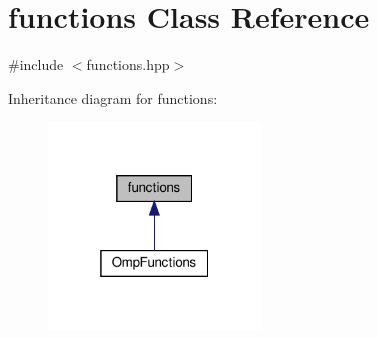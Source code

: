 \hypertarget{classfunctions}{}\section{functions Class Reference}
\label{classfunctions}


{\ttfamily \#include $<$functions.\+hpp$>$}



Inheritance diagram for functions\+:
\nopagebreak
\begin{figure}[H]
\begin{center}
\leavevmode
\includegraphics[width=160pt]{d8/dbe/classfunctions__inherit__graph}
\end{center}
\end{figure}
